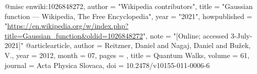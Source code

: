 @misc{ enwiki:1026848272,
    author = "{Wikipedia contributors}",
    title = "Gaussian function --- {Wikipedia}{,} The Free Encyclopedia",
    year = "2021",
    howpublished = "\url{https://en.wikipedia.org/w/index.php?title=Gaussian_function&oldid=1026848272}",
    note = "[Online; accessed 3-July-2021]"
  }
  @article{article,
author = {Reitzner, Daniel and Nagaj, Daniel and Bužek, V.},
year = {2012},
month = {07},
pages = {},
title = {Quantum Walks},
volume = {61},
journal = {Acta Physica Slovaca},
doi = {10.2478/v10155-011-0006-6}
}